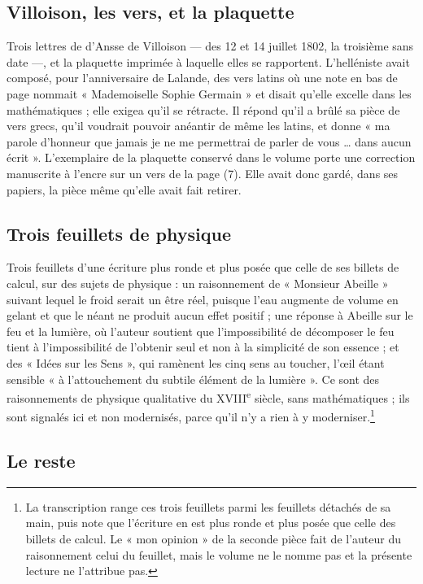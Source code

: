 \documentclass[11pt,a4paper]{article}
\begin{document}
\subsection*{Villoison, les vers, et la plaquette}

Trois lettres de d'Ansse de Villoison — des 12 et 14 juillet 1802, la
troisième sans date —, et la plaquette imprimée à laquelle elles se
rapportent. L'helléniste avait composé, pour
l'anniversaire de Lalande, des vers latins où une note en bas de page nommait
« Mademoiselle Sophie Germain » et disait qu'elle excelle dans les
mathématiques ; elle exigea qu'il se rétracte. Il répond qu'il a brûlé sa pièce
de vers grecs, qu'il voudrait pouvoir anéantir de même les latins, et donne
« ma parole d'honneur que jamais je ne me permettrai de parler de vous \ldots{}
dans aucun écrit ». L'exemplaire de la plaquette conservé dans le volume porte
une correction manuscrite à l'encre sur un vers de la page (7). Elle avait donc
gardé, dans ses papiers, la pièce même qu'elle avait fait retirer.

\subsection*{Trois feuillets de physique}

Trois feuillets d'une écriture plus ronde et plus posée que celle de ses
billets de calcul, sur des sujets de physique : un raisonnement de « Monsieur
Abeille » suivant lequel le froid serait un être réel, puisque l'eau augmente
de volume en gelant et que le néant ne produit aucun effet positif ; une
réponse à Abeille sur le feu et la lumière, où l'auteur soutient que
l'impossibilité de décomposer le feu tient à l'impossibilité de l'obtenir seul
et non à la simplicité de son essence ; et des « Idées sur les Sens », qui
ramènent les cinq sens au toucher, l'œil étant sensible « à l'attouchement du
subtile élément de la lumière ». Ce sont des raisonnements de physique
qualitative du XVIII\textsuperscript{e} siècle, sans mathématiques ; ils sont
signalés ici et non modernisés, parce qu'il n'y a rien à y
moderniser.\footnote{La transcription range ces trois feuillets parmi les
feuillets détachés de sa main, puis note que l'écriture en est plus ronde et
plus posée que celle des billets de calcul. Le « mon opinion » de la seconde pièce
fait de l'auteur du raisonnement celui du feuillet, mais le volume ne le
nomme pas et la présente lecture ne l'attribue pas.}

\subsection*{Le reste}
\end{document}
